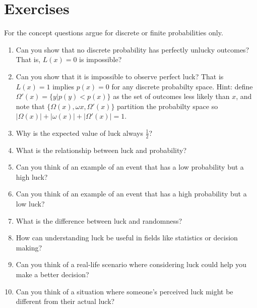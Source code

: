 \section{Exercises}
For the concept questions argue for discrete or finite probabilities only.
\begin{enumerate}
  \item Can you show that no discrete probability has perfectly unlucky outcomes?  That is, $L(x)=0$ is impossible?
  \item Can you show that it is impossible to observe perfect luck?  That is $L(x)=1$ implies $p(x)=0$ for any discrete probabilty space.  Hint: define $\Omega'(x)=\{y | p(y) < p(x) \}$ as the set of outcomes less likely than $x$, and note that $\{\Omega(x),\omega{x},\Omega'(x)\}$ partition the probabilty space so $|\Omega(x)|+|\omega(x)|+|\Omega'(x)|=1$.
  \item Why is the expected value of luck always $\frac{1}{2}$?
  \item What is the relationship between luck and probability?
  \item Can you think of an example of an event that has a low probability but a high luck?
  \item Can you think of an example of an event that has a high probability but a low luck?
  \item What is the difference between luck and randomness?
  \item How can understanding luck be useful in fields like statistics or decision making?
  \item Can you think of a real-life scenario where considering luck could help you make a better decision?
  \item Can you think of a situation where someone's perceived luck might be different from their actual luck?
  

\end{enumerate}
